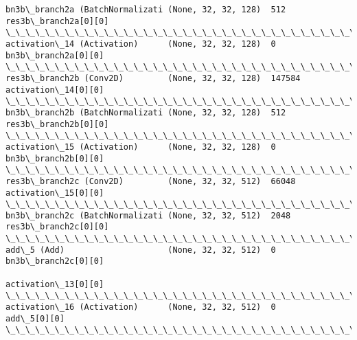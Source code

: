 \documentclass[11pt]{article}
\begin{document}
\begin{Verbatim}[commandchars=\\\{\}]
bn3b\_branch2a (BatchNormalizati (None, 32, 32, 128)  512         res3b\_branch2a[0][0]             
\_\_\_\_\_\_\_\_\_\_\_\_\_\_\_\_\_\_\_\_\_\_\_\_\_\_\_\_\_\_\_\_\_\_\_\_\_\_\_\_\_\_\_\_\_\_\_\_\_\_\_\_\_\_\_\_\_\_\_\_\_\_\_\_\_\_\_\_\_\_\_\_\_\_\_\_\_\_\_\_\_\_\_\_\_\_\_\_\_\_\_\_\_\_\_\_\_\_
activation\_14 (Activation)      (None, 32, 32, 128)  0           bn3b\_branch2a[0][0]              
\_\_\_\_\_\_\_\_\_\_\_\_\_\_\_\_\_\_\_\_\_\_\_\_\_\_\_\_\_\_\_\_\_\_\_\_\_\_\_\_\_\_\_\_\_\_\_\_\_\_\_\_\_\_\_\_\_\_\_\_\_\_\_\_\_\_\_\_\_\_\_\_\_\_\_\_\_\_\_\_\_\_\_\_\_\_\_\_\_\_\_\_\_\_\_\_\_\_
res3b\_branch2b (Conv2D)         (None, 32, 32, 128)  147584      activation\_14[0][0]              
\_\_\_\_\_\_\_\_\_\_\_\_\_\_\_\_\_\_\_\_\_\_\_\_\_\_\_\_\_\_\_\_\_\_\_\_\_\_\_\_\_\_\_\_\_\_\_\_\_\_\_\_\_\_\_\_\_\_\_\_\_\_\_\_\_\_\_\_\_\_\_\_\_\_\_\_\_\_\_\_\_\_\_\_\_\_\_\_\_\_\_\_\_\_\_\_\_\_
bn3b\_branch2b (BatchNormalizati (None, 32, 32, 128)  512         res3b\_branch2b[0][0]             
\_\_\_\_\_\_\_\_\_\_\_\_\_\_\_\_\_\_\_\_\_\_\_\_\_\_\_\_\_\_\_\_\_\_\_\_\_\_\_\_\_\_\_\_\_\_\_\_\_\_\_\_\_\_\_\_\_\_\_\_\_\_\_\_\_\_\_\_\_\_\_\_\_\_\_\_\_\_\_\_\_\_\_\_\_\_\_\_\_\_\_\_\_\_\_\_\_\_
activation\_15 (Activation)      (None, 32, 32, 128)  0           bn3b\_branch2b[0][0]              
\_\_\_\_\_\_\_\_\_\_\_\_\_\_\_\_\_\_\_\_\_\_\_\_\_\_\_\_\_\_\_\_\_\_\_\_\_\_\_\_\_\_\_\_\_\_\_\_\_\_\_\_\_\_\_\_\_\_\_\_\_\_\_\_\_\_\_\_\_\_\_\_\_\_\_\_\_\_\_\_\_\_\_\_\_\_\_\_\_\_\_\_\_\_\_\_\_\_
res3b\_branch2c (Conv2D)         (None, 32, 32, 512)  66048       activation\_15[0][0]              
\_\_\_\_\_\_\_\_\_\_\_\_\_\_\_\_\_\_\_\_\_\_\_\_\_\_\_\_\_\_\_\_\_\_\_\_\_\_\_\_\_\_\_\_\_\_\_\_\_\_\_\_\_\_\_\_\_\_\_\_\_\_\_\_\_\_\_\_\_\_\_\_\_\_\_\_\_\_\_\_\_\_\_\_\_\_\_\_\_\_\_\_\_\_\_\_\_\_
bn3b\_branch2c (BatchNormalizati (None, 32, 32, 512)  2048        res3b\_branch2c[0][0]             
\_\_\_\_\_\_\_\_\_\_\_\_\_\_\_\_\_\_\_\_\_\_\_\_\_\_\_\_\_\_\_\_\_\_\_\_\_\_\_\_\_\_\_\_\_\_\_\_\_\_\_\_\_\_\_\_\_\_\_\_\_\_\_\_\_\_\_\_\_\_\_\_\_\_\_\_\_\_\_\_\_\_\_\_\_\_\_\_\_\_\_\_\_\_\_\_\_\_
add\_5 (Add)                     (None, 32, 32, 512)  0           bn3b\_branch2c[0][0]              
                                                                 activation\_13[0][0]              
\_\_\_\_\_\_\_\_\_\_\_\_\_\_\_\_\_\_\_\_\_\_\_\_\_\_\_\_\_\_\_\_\_\_\_\_\_\_\_\_\_\_\_\_\_\_\_\_\_\_\_\_\_\_\_\_\_\_\_\_\_\_\_\_\_\_\_\_\_\_\_\_\_\_\_\_\_\_\_\_\_\_\_\_\_\_\_\_\_\_\_\_\_\_\_\_\_\_
activation\_16 (Activation)      (None, 32, 32, 512)  0           add\_5[0][0]                      
\_\_\_\_\_\_\_\_\_\_\_\_\_\_\_\_\_\_\_\_\_\_\_\_\_\_\_\_\_\_\_\_\_\_\_\_\_\_\_\_\_\_\_\_\_\_\_\_\_\_\_\_\_\_\_\_\_\_\_\_\_\_\_\_\_\_\_\_\_\_\_\_\_\_\_\_\_\_\_\_\_\_\_\_\_\_\_\_\_\_\_\_\_\_\_\_\_\_

\end{Verbatim}
\end{document}
